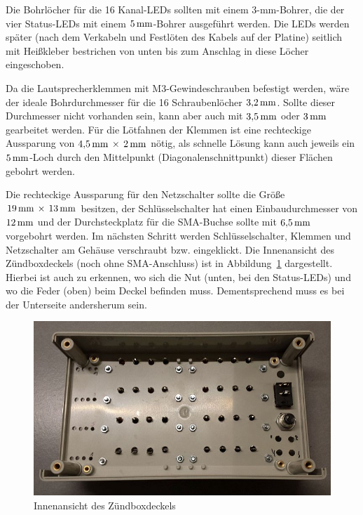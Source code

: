 \documentclass[pdftex, parskip, numbers=noenddot, toc=listof]{scrbook}
\begin{document}
				Die Bohrlöcher für die 16 Kanal-LEDs sollten mit einem 3-mm-Bohrer, die der vier Status-LEDs mit einem $\unit[5]{mm}$-Bohrer ausgeführt werden. Die LEDs werden später (nach dem Verkabeln und Festlöten des Kabels auf der Platine) seitlich mit Heißkleber bestrichen von unten bis zum Anschlag in diese Löcher eingeschoben.

				Da die Lautsprecherklemmen mit M3-Gewindeschrauben befestigt werden, wäre der ideale Bohrdurchmesser für die 16 Schraubenlöcher $\unit[3{,}2]{mm}$. Sollte dieser Durchmesser nicht vorhanden sein, kann aber auch mit $\unit[3{,}5]{mm}$ oder $\unit[3]{mm}$ gearbeitet werden. Für die Lötfahnen der Klemmen ist eine rechteckige Aussparung von $\unit[4{,}5]{mm}\,\times\,\unit[2]{mm}$ nötig, als schnelle Lösung kann auch jeweils ein $\unit[5]{mm}$-Loch durch den Mittelpunkt (Diagonalenschnittpunkt) dieser Flächen gebohrt werden.

				Die rechteckige Aussparung für den Netzschalter sollte die Größe $\unit[19]{mm}\,\times\,\unit[13]{mm}$ besitzen, der Schlüsselschalter hat einen Einbaudurchmesser von $\unit[12]{mm}$ und der Durchsteckplatz für die SMA-Buchse sollte mit $\unit[6{,}5]{mm}$ vorgebohrt werden. Im nächsten Schritt werden Schlüsselschalter, Klemmen und Netzschalter am Gehäuse verschraubt bzw. eingeklickt. Die Innenansicht des Zündboxdeckels (noch ohne SMA-Anschluss) ist in Abbildung~\ref{fig:zuendboxdeckel} dargestellt. Hierbei ist auch zu erkennen, wo sich die Nut (unten, bei den Status-LEDs) und wo die Feder (oben) beim Deckel befinden muss. Dementsprechend muss es bei der Unterseite andersherum sein.

				\begin{figure}
					\centering
					\includegraphics[width=\textwidth]{bilder/zuendboxdeckel}
					\caption{Innenansicht des Zündboxdeckels}
					\label{fig:zuendboxdeckel}
				\end{figure}
\end{document}
